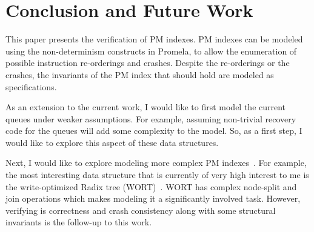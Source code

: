 \section{Conclusion and Future Work}

This paper presents the verification of PM indexes. PM indexes can be modeled
using the non-determinism constructs in Promela, to allow the enumeration of
possible instruction re-orderings and crashes. Despite the re-orderings or
the crashes, the invariants of the PM index that should hold are modeled as
specifications.

As an extension to the current work, I would like to first model the current
queues under weaker assumptions. For example, assuming non-trivial recovery
code for the queues will add some complexity to the model. So, as a first step,
I would like to explore this aspect of these data structures.

Next, I would like to explore modeling more complex PM indexes~\cite{LeeEtAl19-Recipe}.
For example, the most interesting data structure that is currently of very high interest
to me is the write-optimized Radix tree (WORT)~\cite{201600}. WORT has complex node-split
and join operations which makes modeling it a significantly involved task.
However, verifying is correctness and crash consistency along with some
structural invariants is the follow-up to this work.